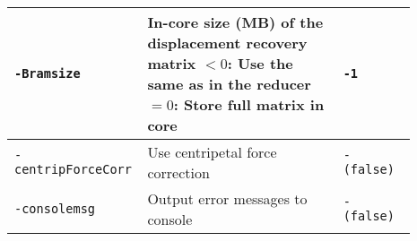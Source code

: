 {\begin{tabular}{|>{\raggedright} p{0.23\linewidth}| p{0.48\linewidth}| p{0.18\linewidth}|}
  \texttt{-Bramsize} &   In-core size (MB) of the displacement recovery matrix\newline
                        $< 0$: Use the same as in the reducer\newline
                        $= 0$: Store full matrix in core   &  \texttt{-1}  \\
  \hline
  {\tt-centripForceCorr} & Use centripetal force correction & {\tt- (false)} \\
  \hline
  {\tt-consolemsg} & Output error messages to console & {\tt- (false)} \\
  \hline
\end{tabular}}

\clearpage
{}
